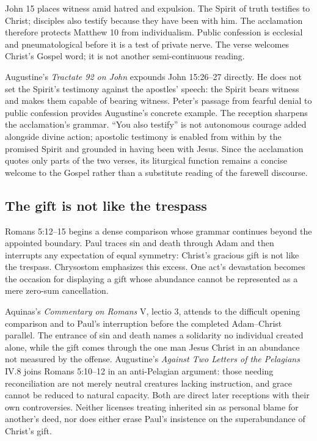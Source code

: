 \begin{deepstudy}
John 15 places witness amid hatred and expulsion. The Spirit of truth testifies to Christ; disciples also testify because they have been with him. The acclamation therefore protects Matthew 10 from individualism. Public confession is ecclesial and pneumatological before it is a test of private nerve. The verse welcomes Christ's Gospel word; it is not another semi-continuous reading.

Augustine's \emph{Tractate 92 on John} expounds John 15:26--27 directly. He does not set the Spirit's testimony against the apostles' speech: the Spirit bears witness and makes them capable of bearing witness. Peter's passage from fearful denial to public confession provides Augustine's concrete example. The reception sharpens the acclamation's grammar. “You also testify” is not autonomous courage added alongside divine action; apostolic testimony is enabled from within by the promised Spirit and grounded in having been with Jesus. Since the acclamation quotes only parts of the two verses, its liturgical function remains a concise welcome to the Gospel rather than a substitute reading of the farewell discourse.

\subsection*{The gift is not like the trespass\enspace{}}

Romans 5:12--15 begins a dense comparison whose grammar continues beyond the appointed boundary. Paul traces sin and death through Adam and then interrupts any expectation of equal symmetry: Christ's gracious gift is not like the trespass. Chrysostom emphasizes this excess. One act's devastation becomes the occasion for displaying a gift whose abundance cannot be represented as a mere zero-sum cancellation.

Aquinas's \emph{Commentary on Romans} V, lectio 3, attends to the difficult opening comparison and to Paul's interruption before the completed Adam--Christ parallel. The entrance of sin and death names a solidarity no individual created alone, while the gift comes through the one man Jesus Christ in an abundance not measured by the offense. Augustine's \emph{Against Two Letters of the Pelagians} IV.8 joins Romans 5:10--12 in an anti-Pelagian argument: those needing reconciliation are not merely neutral creatures lacking instruction, and grace cannot be reduced to natural capacity. Both are direct later receptions with their own controversies. Neither licenses treating inherited sin as personal blame for another's deed, nor does either erase Paul's insistence on the superabundance of Christ's gift.


\end{deepstudy}
